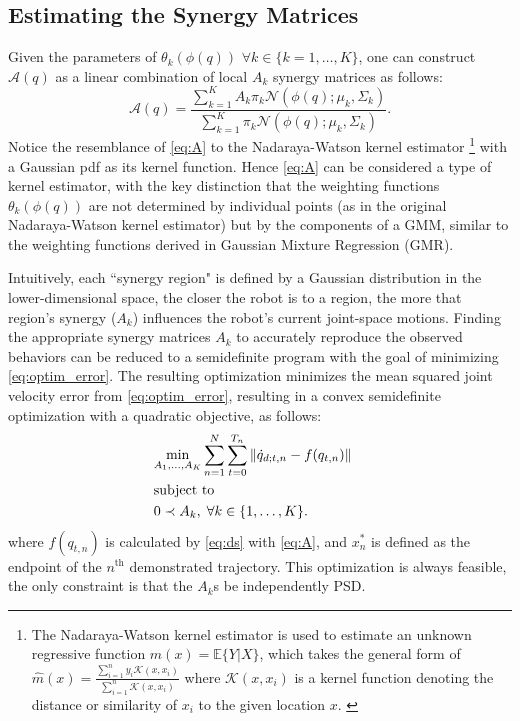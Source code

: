\documentclass[letterpaper, 10 pt, conference,fleqn]{ieeeconf}
\begin{document}
\subsection{Estimating the Synergy Matrices}
Given the parameters of $\theta_k(\phi(q))$ $\forall k \in \{k=1,\dots,K\}$, one can construct $\mathcal{A}(q)$ as a linear combination of local $A_k$ synergy matrices as follows: 
\begin{equation}
\label{eq:A}
\mathcal{A}(q) = \frac{\sum_{k=1}^K A_k \pi_k\mathcal{N}(\phi(q); \mu_k, \Sigma_k)}{\sum_{k=1}^K \pi_k\mathcal{N} (\phi(q); \mu_k, \Sigma_k)}.
\end{equation} 
Notice the resemblance of \eqref{eq:A} to the Nadaraya-Watson kernel estimator \cite{nadaraya1964regress,watson1964regress}\footnote{The Nadaraya-Watson kernel estimator is used to estimate an unknown regressive function $m(x) = \mathbb{E}\{Y|X\}$, which takes the general form of $\widehat{m}(x) = \frac{\sum_{i=1}^n y_i \mathcal{K}(x,x_i)}{\sum_{i=1}^n \mathcal{K}(x,x_i)}$ where $\mathcal{K}(x,x_i)$ is a kernel function denoting the distance or similarity of $x_i$ to the given location $x$. \cite{nadaraya1964regress,watson1964regress}} with a Gaussian pdf as its kernel function. Hence \eqref{eq:A} can be considered a type of kernel estimator, with the key distinction that the weighting functions $\theta_k(\phi(q))$ are not determined by individual points (as in the original Nadaraya-Watson kernel estimator) but by the components of a GMM, similar to the weighting functions derived in Gaussian Mixture Regression (GMR). 

Intuitively, each ``synergy region" is defined by a Gaussian distribution in the lower-dimensional space, the closer the robot is to a region, the more that region's synergy ($A_k$) influences the robot's current joint-space motions. Finding the appropriate synergy matrices $A_k$ to accurately reproduce the observed behaviors can be reduced to a semidefinite program with the goal of minimizing \eqref{eq:optim_error}. The resulting optimization minimizes the mean squared joint velocity error from \eqref{eq:optim_error}, resulting in a convex semidefinite optimization with a quadratic objective, as follows:
\begin{equation}
\vspace{-10pt}
\begin{aligned}
&\underset{A_1, \dots, A_K}{\text{min}} 
\sum_{n=1}^N\sum_{t=0}^{T_n} \left \| \dot{q}_{d;t,n} - f(q_{t,n}) \right \| \\
& \text{subject to}&\\
&  0 \prec A_k, \; \forall k \in \{1, \dots, K\}. &
\end{aligned}
\label{eq:opt}
\end{equation}
where $f(q_{t,n})$ is calculated by %
 \eqref{eq:ds} with \eqref{eq:A}, and $x^*_{n}$ is defined as the endpoint of the $ n^{\text{th}} $ demonstrated trajectory. This optimization is always feasible, the only constraint is that the $A_k$s be independently PSD.
\end{document}
